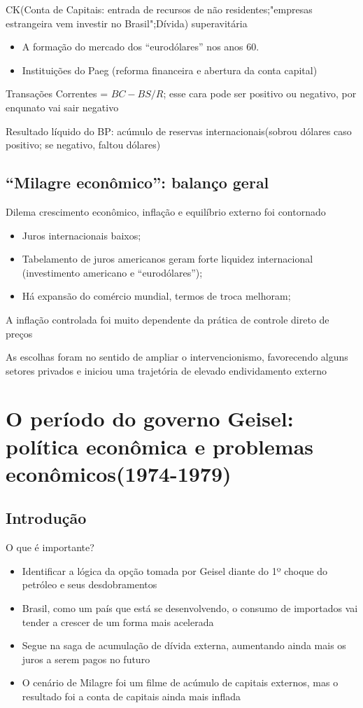 \documentclass[a4paper,12pt]{article}[abntex2]
\begin{document}
CK(Conta de Capitais: entrada de recursos de não residentes;"empresas estrangeira vem investir no Brasil";Dívida) superavitária\begin{itemize}
    \item A formação do mercado dos “eurodólares” nos anos 60.
    \item Instituições do Paeg (reforma financeira e abertura da conta capital)
\end{itemize}

Transações Correntes = \(BC-BS/R\); esse cara pode ser positivo ou negativo, por enqunato vai sair negativo

Resultado líquido do BP: acúmulo de reservas internacionais(sobrou dólares caso positivo; se negativo, faltou dólares)

\subsection{\textbf{“Milagre econômico”: balanço geral}}
Dilema crescimento econômico, inflação e equilíbrio externo foi contornado\begin{itemize}
    \item Juros internacionais baixos;
    \item Tabelamento de juros americanos geram forte liquidez internacional (investimento americano e “eurodólares”);
    \item Há expansão do comércio mundial, termos de troca melhoram;
\end{itemize}

A inflação controlada foi muito dependente da prática de controle direto de preços

As escolhas foram no sentido de ampliar o intervencionismo, favorecendo alguns setores privados e iniciou uma trajetória de elevado endividamento externo
\newpage

\section{\textbf{O período do governo Geisel: política econômica e problemas econômicos(1974-1979)}}
\subsection{\textbf{Introdução}}
O que é importante?\begin{itemize}
    \item Identificar a lógica da opção tomada por Geisel diante do 1º choque do petróleo e seus desdobramentos
    \item Brasil, como um país que está se desenvolvendo, o consumo de importados vai tender a crescer de um forma mais acelerada
    \item Segue na saga de acumulação de dívida externa, aumentando ainda mais os juros a serem pagos no futuro
    \item O cenário de Milagre foi um filme de acúmulo de capitais externos, mas o resultado foi a conta de capitais ainda mais inflada
    \end{itemize}
\end{document}
